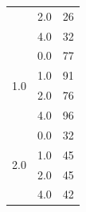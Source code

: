 \begin{longtable}{|c|c|c|c|c|}
& \multicolumn{2}{c|}{2.0} & \multicolumn{2}{c|}{26} \\
& \multicolumn{2}{c|}{4.0} & \multicolumn{2}{c|}{32} \\
\hline
\multirow{4}{*}{1.0} & \multicolumn{2}{c|}{0.0} & \multicolumn{2}{c|}{77} \\
& \multicolumn{2}{c|}{1.0} & \multicolumn{2}{c|}{91} \\
& \multicolumn{2}{c|}{2.0} & \multicolumn{2}{c|}{76} \\
& \multicolumn{2}{c|}{4.0} & \multicolumn{2}{c|}{96} \\
\hline
\multirow{4}{*}{2.0} & \multicolumn{2}{c|}{0.0} & \multicolumn{2}{c|}{32} \\
& \multicolumn{2}{c|}{1.0} & \multicolumn{2}{c|}{45} \\
& \multicolumn{2}{c|}{2.0} & \multicolumn{2}{c|}{45} \\
& \multicolumn{2}{c|}{4.0} & \multicolumn{2}{c|}{42} \\
\hline
\end{longtable}


